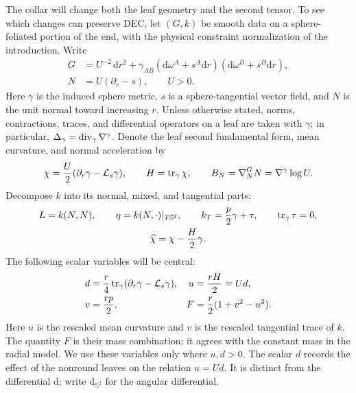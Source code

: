 The collar will change both the leaf geometry and the second tensor.
To see which changes can preserve DEC, let $(G,k)$ be smooth data on a
sphere-foliated portion of the end, with the physical constraint
normalization of the introduction. Write
\begin{equation}\label{eq:foliation}
 \begin{split}
 G&=U^{-2}\,\mathrm dr^2
   +\gamma_{AB}(\mathrm d\omega^A+s^A\mathrm dr)
                 (\mathrm d\omega^B+s^B\mathrm dr),\\
 N&=U(\partial_r-s),\qquad U>0.
 \end{split}
\end{equation}
Here $\gamma$ is the induced sphere metric, $s$ is a sphere-tangential
vector field, and $N$ is the unit normal toward increasing $r$.
Unless otherwise stated, norms, contractions, traces, and differential
operators on a leaf are taken with $\gamma$; in particular,
$\Delta_\gamma=\operatorname{div}_\gamma\nabla^\gamma$. Denote the leaf second
fundamental form, mean curvature, and normal acceleration by
\begin{equation}\label{eq:leaf-geometry}
 \chi=\frac U2(\partial_r\gamma-\mathcal L_s\gamma),
 \qquad H=\operatorname{tr}_\gamma\chi,
 \qquad B_N=\nabla^G_NN=\nabla^\gamma\log U.
\end{equation}
Decompose $k$ into its normal, mixed, and tangential parts:
\begin{equation}\label{eq:k-decomposition}
 \begin{gathered}
 L=k(N,N),\qquad \eta=k(N,\cdot)|_{T\mathbb S^2},\qquad
 k_T=\frac p2\gamma+\tau,\qquad \operatorname{tr}_\gamma\tau=0,\\
 \widehat\chi=\chi-\frac H2\gamma.
 \end{gathered}
\end{equation}
The following scalar variables will be central:
\begin{equation}\label{eq:mass-variables}
 \begin{aligned}
 d&=\frac r4\operatorname{tr}_\gamma(\partial_r\gamma-\mathcal L_s\gamma),
 &u&=\frac{rH}{2}=Ud,\\
 v&=\frac{rp}{2},
 &F&=\frac r2(1+v^2-u^2).
 \end{aligned}
\end{equation}
Here $u$ is the rescaled mean curvature and $v$ is the rescaled
tangential trace of $k$. The quantity $F$ is their mass combination;
it agrees with the constant mass in the radial model. We use these
variables only where $u,d>0$. The scalar $d$ records the effect of
the nonround leaves on the relation $u=Ud$. It is distinct from the
differential $\mathrm d$; write $\mathrm d_{\mathbb S^2}$ for the
angular differential.

